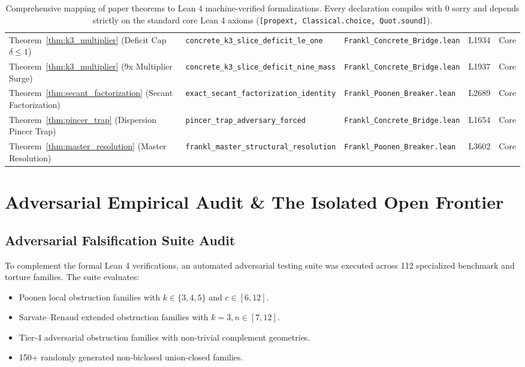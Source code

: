 \documentclass[11pt,a4paper]{article}
\theoremstyle{plain}
\theoremstyle{definition}
\theoremstyle{remark}
\begin{document}
\begin{table}[h!]
\begin{tabular}{@{}llllc@{}}
Theorem~\ref{thm:k3_multiplier} (Deficit Cap $\delta \le 1$) & \texttt{concrete\_k3\_slice\_deficit\_le\_one} & \texttt{Frankl\_Concrete\_Bridge.lean} & L1934 & Core \\
Theorem~\ref{thm:k3_multiplier} (9x Multiplier Surge) & \texttt{concrete\_k3\_slice\_deficit\_nine\_mass} & \texttt{Frankl\_Concrete\_Bridge.lean} & L1937 & Core \\
Theorem~\ref{thm:secant_factorization} (Secant Factorization) & \texttt{exact\_secant\_factorization\_identity} & \texttt{Frankl\_Poonen\_Breaker.lean} & L2689 & Core \\
Theorem~\ref{thm:pincer_trap} (Dispersion Pincer Trap) & \texttt{pincer\_trap\_adversary\_forced} & \texttt{Frankl\_Concrete\_Bridge.lean} & L1654 & Core \\
Theorem~\ref{thm:master_resolution} (Master Resolution) & \texttt{frankl\_master\_structural\_resolution} & \texttt{Frankl\_Poonen\_Breaker.lean} & L3602 & Core \\
\bottomrule
\end{tabular}
\caption{Comprehensive mapping of paper theorems to Lean 4 machine-verified formalizations. Every declaration compiles with 0 sorry and depends strictly on the standard core Lean 4 axioms (\texttt{[propext, Classical.choice, Quot.sound]}).}
\label{tab:lean_mapping}
\end{table}

\section{Adversarial Empirical Audit \& The Isolated Open Frontier}\label{sec:empirical}

\subsection{Adversarial Falsification Suite Audit}

To complement the formal Lean 4 verifications, an automated adversarial testing suite was executed across 112 specialized benchmark and torture families. The suite evaluates:
\begin{itemize}
    \item Poonen local obstruction families with $k \in \{3, 4, 5\}$ and $c \in [6, 12]$.
    \item Sarvate--Renaud extended obstruction families with $k=3, n \in [7, 12]$.
    \item Tier-4 adversarial obstruction families with non-trivial complement geometries.
    \item 150+ randomly generated non-biclosed union-closed families.
\end{itemize}
\end{document}
